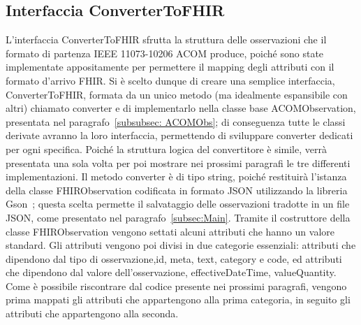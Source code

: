 \documentclass[a4paper]{article}
\begin{document}
\subsection{Interfaccia ConverterToFHIR}\label{subsubsec:ConverterToFHIR}
L'interfaccia ConverterToFHIR sfrutta la struttura delle osservazioni che il formato di partenza IEEE 11073-10206 ACOM produce, poiché sono state implementate appositamente per permettere il mapping degli attributi con il formato d'arrivo FHIR.
Si è scelto dunque di creare una semplice interfaccia, ConverterToFHIR, formata da un unico metodo (ma idealmente espansibile con altri) chiamato converter e di implementarlo nella classe base ACOMObservation, presentata nel paragrafo~\ref{subsubsec: ACOMObs}; di conseguenza tutte le classi derivate avranno la loro interfaccia, permettendo di sviluppare converter dedicati per ogni specifica.
Poiché la struttura logica del convertitore è simile, verrà presentata una sola volta per poi mostrare nei prossimi paragrafi le tre differenti implementazioni.
Il metodo converter è di tipo string, poiché restituirà l'istanza della classe FHIRObservation codificata in formato JSON utilizzando la libreria Gson~\cite{GSON}; questa scelta permette il salvataggio delle osservazioni tradotte in un file JSON, come presentato nel paragrafo~\ref{subsec:Main}.
Tramite il costruttore della classe FHIRObservation vengono settati alcuni attributi che hanno un valore standard.
Gli attributi vengono poi divisi in due categorie essenziali: attributi che dipendono dal tipo di osservazione,id, meta, text, category e code, ed attributi che dipendono dal valore dell'osservazione, effectiveDateTime, valueQuantity.
Come è possibile riscontrare dal codice presente nei prossimi paragrafi, vengono prima mappati gli attributi che appartengono alla prima categoria, in seguito gli attributi che appartengono alla seconda.
\end{document}
